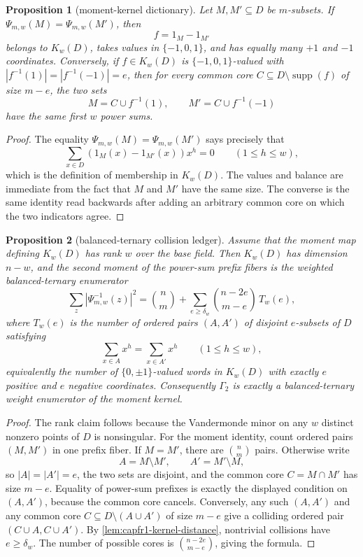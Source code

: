 \documentclass[11pt]{article}
\newtheorem{proposition}[proposition]{Proposition}
\theoremstyle{definition}
\theoremstyle{remark}
\begin{document}
\begin{proposition}[moment-kernel dictionary]\label{prop:capfr1-moment-kernel}
Let \(M,M'\subseteq D\) be \(m\)-subsets.  If \(\Psi_{m,w}(M)=\Psi_{m,w}(M')\), then
\[
        f=1_M-1_{M'}
\]
belongs to \(K_w(D)\), takes values in \(\{-1,0,1\}\), and has equally many \(+1\) and \(-1\) coordinates.  Conversely, if \(f\in K_w(D)\) is \(\{-1,0,1\}\)-valued with \(|f^{-1}(1)|=|f^{-1}(-1)|=e\), then for every common core \(C\subseteq D\setminus\operatorname{supp}(f)\) of size \(m-e\), the two sets
\[
        M=C\cup f^{-1}(1),
        \qquad
        M'=C\cup f^{-1}(-1)
\]
have the same first \(w\) power sums.
\end{proposition}

\begin{proof}
The equality \(\Psi_{m,w}(M)=\Psi_{m,w}(M')\) says precisely that
\[
        \sum_{x\in D}(1_M(x)-1_{M'}(x))x^h=0
        \qquad(1\le h\le w),
\]
which is the definition of membership in \(K_w(D)\).  The values and balance are immediate from the fact that \(M\) and \(M'\) have the same size.  The converse is the same identity read backwards after adding an arbitrary common core on which the two indicators agree.

\end{proof}

\begin{proposition}[balanced-ternary collision ledger]\label{prop:capfr1-collision-ledger}
Assume that the moment map defining \(K_w(D)\) has rank \(w\) over the base field.  Then \(K_w(D)\) has dimension \(n-w\), and the second moment of the power-sum prefix fibers is the weighted balanced-ternary enumerator
\[
        \sum_z |\Psi_{m,w}^{-1}(z)|^2
        =
        \binom n m+
        \sum_{e\ge \delta_w}\binom{n-2e}{m-e}\,T_w(e),
\]
where \(T_w(e)\) is the number of ordered pairs \((A,A')\) of disjoint \(e\)-subsets of \(D\) satisfying
\[
        \sum_{x\in A}x^h=\sum_{x\in A'}x^h
        \qquad(1\le h\le w),
\]
equivalently the number of \(\{0,\pm1\}\)-valued words in \(K_w(D)\) with exactly \(e\) positive and \(e\) negative coordinates.  Consequently \(\Gamma_2\) is exactly a balanced-ternary weight enumerator of the moment kernel.
\end{proposition}

\begin{proof}
The rank claim follows because the Vandermonde minor on any \(w\) distinct nonzero points of \(D\) is nonsingular.  For the moment identity, count ordered pairs \((M,M')\) in one prefix fiber.  If \(M=M'\), there are \(\binom n m\) pairs.  Otherwise write
\[
        A=M\setminus M',\qquad A'=M'\setminus M,
\]
so \(|A|=|A'|=e\), the two sets are disjoint, and the common core \(C=M\cap M'\) has size \(m-e\).  Equality of power-sum prefixes is exactly the displayed condition on \((A,A')\), because the common core cancels.  Conversely, any such \((A,A')\) and any common core \(C\subseteq D\setminus(A\cup A')\) of size \(m-e\) give a colliding ordered pair \((C\cup A,C\cup A')\).  By \cref{lem:capfr1-kernel-distance}, nontrivial collisions have \(e\ge\delta_w\).  The number of possible cores is \(\binom{n-2e}{m-e}\), giving the formula.
\end{proof}
\end{document}
